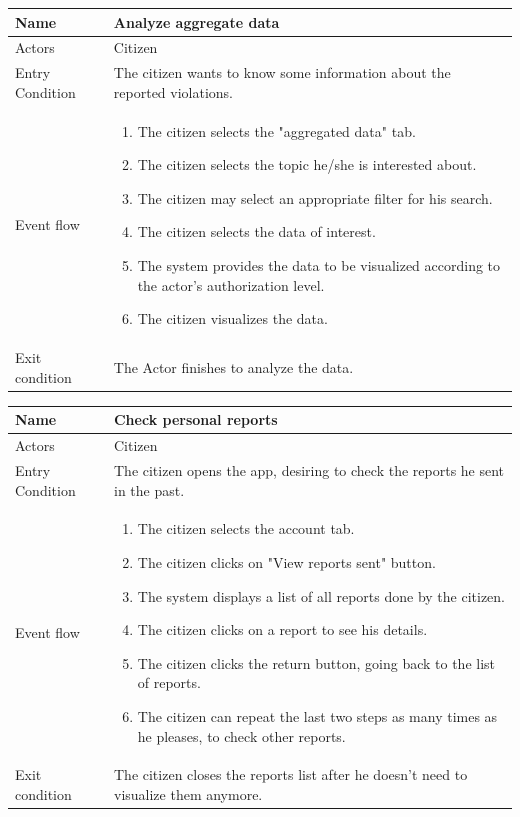 \vskip 0.2in
\begin{tabular}{|p{3.1cm}|p{11.6cm}|}
\hline
Name & Analyze aggregate data\\
\hline
Actors & Citizen\\
\hline
Entry Condition & The citizen wants to know some information about the reported violations.\\
\hline
Event flow & \begin{enumerate}
                \item The citizen selects the "aggregated data" tab.
                \item The citizen selects the topic he/she is interested about.
                \item The citizen may select an appropriate filter for his search.
                \item The citizen selects the data of interest.
                \item The system provides the data to be visualized according to the actor's authorization level.
                \item The citizen visualizes the data.
            \end{enumerate}\\
\hline
Exit condition & The Actor finishes to analyze the data.\\
\hline
\end{tabular}

\vskip 0.2in
\begin{tabular}{|p{3.1cm}|p{11.6cm}|}
	\hline
	Name & Check personal reports\\
	\hline
	Actors & Citizen\\
	\hline
	Entry Condition & The citizen opens the app, desiring to check the reports he sent in the past.\\
	\hline
	Event flow & \begin{enumerate}
		\item The citizen selects the account tab.
		\item The citizen clicks on "View reports sent" button.
		\item The system displays a list of all reports done by the citizen.
		\item The citizen clicks on a report to see his details.
		\item The citizen clicks the return button, going back to the list of reports.
		\item The citizen can repeat the last two steps as many times as he pleases, to check other reports.
	\end{enumerate}\\
	\hline
	Exit condition & The citizen closes the reports list after he doesn't need to visualize them anymore.\\
	\hline
\end{tabular}

